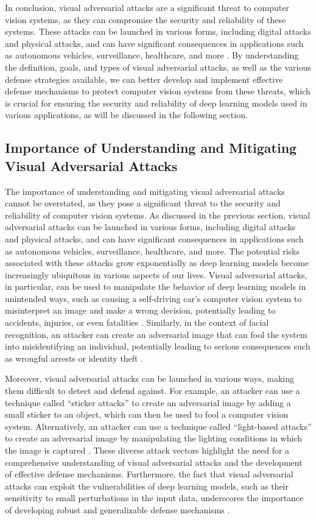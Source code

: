 \documentclass[11pt]{article}
\begin{document}
In conclusion, visual adversarial attacks are a significant threat to computer vision systems, as they can compromise the security and reliability of these systems. These attacks can be launched in various forms, including digital attacks and physical attacks, and can have significant consequences in applications such as autonomous vehicles, surveillance, healthcare, and more \cite{ref10}. By understanding the definition, goals, and types of visual adversarial attacks, as well as the various defense strategies available, we can better develop and implement effective defense mechanisms to protect computer vision systems from these threats, which is crucial for ensuring the security and reliability of deep learning models used in various applications, as will be discussed in the following section.

\subsection{Importance of Understanding and Mitigating Visual Adversarial Attacks}

The importance of understanding and mitigating visual adversarial attacks cannot be overstated, as they pose a significant threat to the security and reliability of computer vision systems. As discussed in the previous section, visual adversarial attacks can be launched in various forms, including digital attacks and physical attacks, and can have significant consequences in applications such as autonomous vehicles, surveillance, healthcare, and more. The potential risks associated with these attacks grow exponentially as deep learning models become increasingly ubiquitous in various aspects of our lives. Visual adversarial attacks, in particular, can be used to manipulate the behavior of deep learning models in unintended ways, such as causing a self-driving car's computer vision system to misinterpret an image and make a wrong decision, potentially leading to accidents, injuries, or even fatalities \cite{ref11}. Similarly, in the context of facial recognition, an attacker can create an adversarial image that can fool the system into misidentifying an individual, potentially leading to serious consequences such as wrongful arrests or identity theft \cite{ref12}.

Moreover, visual adversarial attacks can be launched in various ways, making them difficult to detect and defend against. For example, an attacker can use a technique called ``sticker attacks'' to create an adversarial image by adding a small sticker to an object, which can then be used to fool a computer vision system. Alternatively, an attacker can use a technique called ``light-based attacks'' to create an adversarial image by manipulating the lighting conditions in which the image is captured \cite{ref13}. These diverse attack vectors highlight the need for a comprehensive understanding of visual adversarial attacks and the development of effective defense mechanisms. Furthermore, the fact that visual adversarial attacks can exploit the vulnerabilities of deep learning models, such as their sensitivity to small perturbations in the input data, underscores the importance of developing robust and generalizable defense mechanisms \cite{ref14}.
\end{document}
